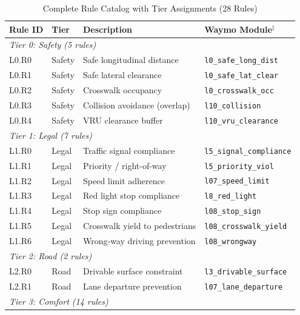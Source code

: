 \begin{table}[h]
\centering
\caption{Complete Rule Catalog with Tier Assignments (28 Rules)}
\label{tab:rule_catalog}
\small
\begin{tabular}{llp{4.5cm}p{3.5cm}}
\toprule
\textbf{Rule ID} & \textbf{Tier} & \textbf{Description} & \textbf{Waymo Module}$^\ddagger$ \\
\midrule
\multicolumn{4}{l}{\textit{Tier 0: Safety (5 rules)}} \\
L0.R0 & Safety & Safe longitudinal distance & \texttt{\footnotesize l0\_safe\_long\_dist} \\
L0.R1 & Safety & Safe lateral clearance & \texttt{\footnotesize l0\_safe\_lat\_clear} \\
L0.R2 & Safety & Crosswalk occupancy & \texttt{\footnotesize l0\_crosswalk\_occ} \\
L0.R3 & Safety & Collision avoidance (overlap) & \texttt{\footnotesize l10\_collision} \\
L0.R4 & Safety & VRU clearance buffer & \texttt{\footnotesize l10\_vru\_clearance} \\
\midrule
\multicolumn{4}{l}{\textit{Tier 1: Legal (7 rules)}} \\
L1.R0 & Legal & Traffic signal compliance & \texttt{\footnotesize l5\_signal\_compliance} \\
L1.R1 & Legal & Priority / right-of-way & \texttt{\footnotesize l5\_priority\_viol} \\
L1.R2 & Legal & Speed limit adherence & \texttt{\footnotesize l07\_speed\_limit} \\
L1.R3 & Legal & Red light stop compliance & \texttt{\footnotesize l8\_red\_light} \\
L1.R4 & Legal & Stop sign compliance & \texttt{\footnotesize l08\_stop\_sign} \\
L1.R5 & Legal & Crosswalk yield to pedestrians & \texttt{\footnotesize l08\_crosswalk\_yield} \\
L1.R6 & Legal & Wrong-way driving prevention & \texttt{\footnotesize l08\_wrongway} \\
\midrule
\multicolumn{4}{l}{\textit{Tier 2: Road (2 rules)}} \\
L2.R0 & Road & Drivable surface constraint & \texttt{\footnotesize l3\_drivable\_surface} \\
L2.R1 & Road & Lane departure prevention & \texttt{\footnotesize l07\_lane\_departure} \\
\midrule
\multicolumn{4}{l}{\textit{Tier 3: Comfort (14 rules)}} \\

\end{tabular}
\end{table}
